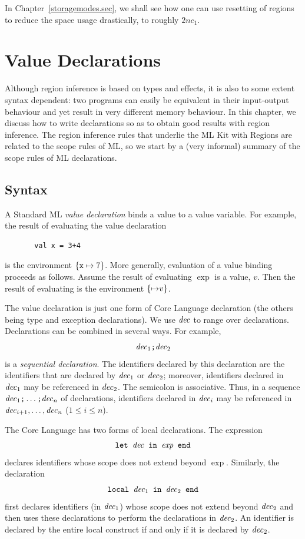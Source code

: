 \documentclass[12pt]{book}
\begin{document}
In Chapter~\ref{storagemodes.sec}, we shall see how one can use resetting of
regions to reduce the space usage drastically, to roughly $2nc_1$.

\chapter{Value Declarations}
\label{valdecl.sec}

Although region inference is based on types and effects, it is also
to some extent syntax dependent: two programs can easily be equivalent
in their input-output behaviour and yet result in very different memory
behaviour. In this chapter, we discuss how to write 
declarations so as
to obtain good results with region inference. The region inference rules
that underlie the ML Kit with Regions are related to the scope rules of
ML, so we start by a (very informal) summary of the scope rules of ML declarations.
\section{Syntax}
A Standard ML  {\em value declaration} binds a value 
to a value variable. For example, the result of evaluating the value declaration
\begin{verbatim}
       val x = 3+4
\end{verbatim}
is the environment $\{\hbox{\tt x}\mapsto 7\}$. More generally,
evaluation of a value binding  proceeds
as follows. Assume the result of evaluating $\exp$ is a value, $v$.
Then the result of evaluating  is the
environment $\{{\it \mapsto} v\}$.

The value declaration is just one form of Core Language declaration 
(the others being type and exception declarations). We use ${\it dec}$ to
range over declarations. Declarations can be
combined in several ways. For example, 
$${\it dec}_1\hbox{\tt ;}{\it dec}_2$$
is a {\em sequential declaration}. The identifiers declared by this
declaration are the identifiers that are declared by ${\it dec}_1$ or ${\it dec}_2$;
moreover, identifiers declared in ${\it dec}_1$ may be referenced in ${\it dec}_2$.
The semicolon is associative. Thus, in a sequence 
${\it dec}_1\hbox{\tt ;}\ldots\hbox{\tt ;}{\it dec}_n$
of declarations, identifiers declared in 
${\it dec}_i$ may be referenced in ${\it dec}_{i+1},\ldots
,{\it dec}_n$ ($1\leq i\leq n$). 

The Core Language has two forms of local declarations. The
expression 
$$\hbox{\tt let ${\it dec}$ in $\hbox{\it exp}$ end}$$
declares identifiers whose scope does not extend beyond $\exp$. Similarly,
the declaration
$$\hbox{\tt local ${\it dec}_1$ in ${\it dec}_2$ end}$$
first declares identifiers (in ${\it dec}_1$) whose scope does not extend beyond
${\it dec}_2$ and then uses these declarations to perform the declarations in
${\it dec}_2$. An identifier is declared by the entire local construct if and only
if it is declared by ${\it dec}_2$.
\end{document}
